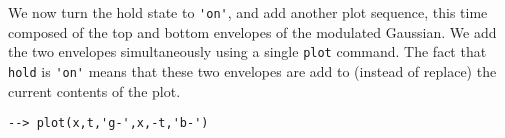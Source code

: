 
We now turn the hold state to \verb|'on'|, and add another plot
sequence, this time composed of the top and bottom envelopes of
the modulated Gaussian.  We add the two envelopes simultaneously
using a single \verb|plot| command.  The fact that \verb|hold| is
\verb|'on'| means that these two envelopes are add to (instead of
replace) the current contents of the plot.
\begin{verbatim}
--> plot(x,t,'g-',x,-t,'b-')
\end{verbatim}

